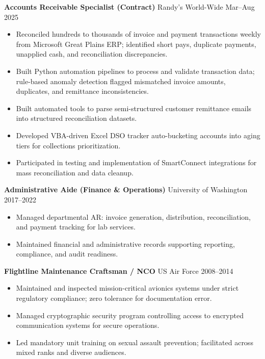 \documentclass[11pt,a4paper]{article}
\begin{document}
\noindent
\textbf{Accounts Receivable Specialist (Contract)} \hfill Randy's World-Wide \hfill Mar--Aug 2025
\begin{itemize}
    \item Reconciled hundreds to thousands of invoice and payment transactions weekly from Microsoft Great Plains ERP; identified short pays, duplicate payments, unapplied cash, and reconciliation discrepancies.
    \item Built Python automation pipelines to process and validate transaction data; rule-based anomaly detection flagged mismatched invoice amounts, duplicates, and remittance inconsistencies.
    \item Built automated tools to parse semi-structured customer remittance emails into structured reconciliation datasets.
    \item Developed VBA-driven Excel DSO tracker auto-bucketing accounts into aging tiers for collections prioritization.
    \item Participated in testing and implementation of SmartConnect integrations for mass reconciliation and data cleanup.
\end{itemize}

\vspace{0.2cm}
\noindent
\textbf{Administrative Aide (Finance \& Operations)} \hfill University of Washington \hfill 2017--2022
\begin{itemize}
    \item Managed departmental AR: invoice generation, distribution, reconciliation, and payment tracking for lab services.
    \item Maintained financial and administrative records supporting reporting, compliance, and audit readiness.
\end{itemize}

\vspace{0.2cm}
\noindent
\textbf{Flightline Maintenance Craftsman / NCO} \hfill US Air Force \hfill 2008--2014
\begin{itemize}
    \item Maintained and inspected mission-critical avionics systems under strict regulatory compliance; zero tolerance for documentation error.
    \item Managed cryptographic security program controlling access to encrypted communication systems for secure operations.
    \item Led mandatory unit training on sexual assault prevention; facilitated across mixed ranks and diverse audiences.
\end{itemize}
\end{document}
